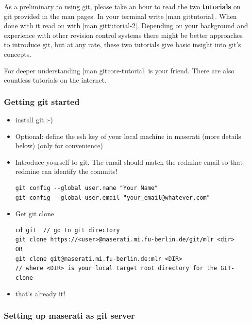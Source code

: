 As a preliminary to using git, please take an hour to read the two
\textbf{tutorials} on git provided in the man pages. In your terminal
write |man gittutorial|. When done with it read on with
|man gittutorial-2|.
Depending on your background and experience with other revision control
systems there might be better approaches to introduce git, but at any
rate, these two tutorials give basic insight into git's concepts.

For deeper understanding |man gitcore-tutorial| is your friend.
There are also countless tutorials on the internet.


\subsubsection{Getting git started}

\begin{itemize}

\item install git :-)

\item Optional: define the ssh key of your local machine in maserati
(more details below) (only for convenience)
\item Introduce yourself to git. The email should match the redmine email so that redmine can identify the commits!
\begin{code}
\begin{verbatim}
git config --global user.name "Your Name"
git config --global user.email "your_email@whatever.com"
\end{verbatim}
\end{code}

\item Get git clone
\begin{code}
\begin{verbatim}
cd git  // go to git directory
git clone https://<user>@maserati.mi.fu-berlin.de/git/mlr <dir>
OR
git clone git@maserati.mi.fu-berlin.de:mlr <DIR>
// where <DIR> is your local target root directory for the GIT-clone
\end{verbatim}
\end{code}

\item that's already it!

\end{itemize}


\subsubsection{Setting up maserati as git server}

